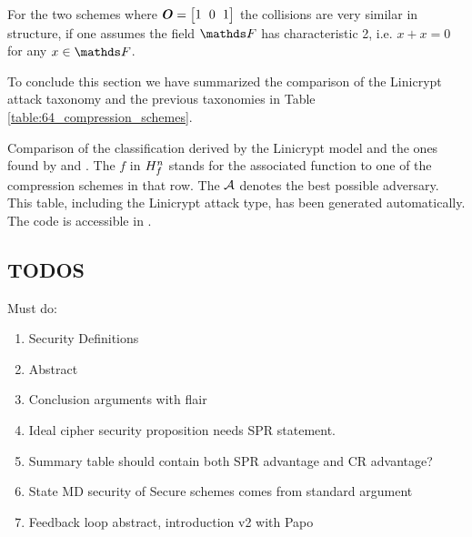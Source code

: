 For the two schemes where $\O = \m{1&0&1}$ the collisions are very similar in structure,
if one assumes the field $\F$ has characteristic 2, i.e. $x + x = 0$ for any $x \in \F$.

\begin{center}
\end{center}

To conclude this section we have summarized the comparison of the Linicrypt attack taxonomy and the previous taxonomies in Table \ref{table:64_compression_schemes}.

\begin{table}[]
\centering
\renewcommand{\arraystretch}{1.2}

\caption{
    Comparison of the classification derived by the Linicrypt model and the ones found by \cite{C:PreGovVan93} and \cite{C:BlaRogShr02}.
    The $f$ in $H^n_{f}$ stands for the associated function to one of the compression schemes in that row.
    The $\mathcal{A}$ denotes the best possible adversary.
    This table, including the Linicrypt attack type, has been generated automatically.
    The code is accessible in \cite{Semmel_Code_for_Modeling_2022}.
    }
\label{table:64_compression_schemes}
\end{table}

\pagebreak

\subsection{TODOS}

Must do:
\begin{enumerate}
\item Security Definitions
\item Abstract
\item Conclusion arguments with flair
\item Ideal cipher security proposition needs SPR statement.
\item Summary table should contain both SPR advantage and CR advantage?
\item State MD security of Secure schemes comes from standard argument
\item Feedback loop abstract, introduction v2 with Papo
\end{enumerate}

